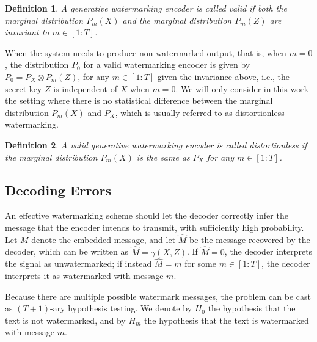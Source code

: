 \documentclass[11pt,letterpaper]{article}
\newtheorem{definition}{\textbf{Definition}}%
\begin{document}
\begin{definition}\label{req:encoder_requirement}
A generative watermarking encoder is called valid if both the marginal distribution $P_m(X)$ and the marginal distribution $P_m(Z)$ are invariant to $m\in[1:T]$. 
\end{definition}

When the system needs to produce non-watermarked output, that is, when $m = 0$, the distribution $P_0$ for a valid watermarking encoder is given by $P_0=P_X\otimes P_m(Z)$, for any $m\in[1:T]$ given the invariance above, i.e., the secret key $Z$ is independent of $X$ when $m=0$. We will only consider in this work the setting where there is no statistical difference between the marginal distribution $P_m(X)$ and $P_X$, which is usually referred to as distortionless watermarking.
\begin{definition}\label{req:distortionless}
A valid generative watermarking encoder is called distortionless if the marginal distribution $P_m(X)$ is the same as $P_X$ for any $m\in [1:T]$.
\end{definition} 


\subsection{Decoding Errors}

An effective watermarking scheme should let the decoder correctly infer the message that the encoder intends to transmit, with sufficiently high probability. Let $M$ denote the embedded message, and let $\hat{M}$ be the message recovered by the decoder, which can be written as $\hat{M} = \gamma(X, Z)$. If $\hat{M} = 0$, the decoder interprets the signal as unwatermarked; if instead $\hat{M} = m$ for some $m \in [1:T]$, the decoder interprets it as watermarked with message $m$. 

Because there are multiple possible watermark messages, the problem can be cast as $(T+1)$-ary hypothesis testing. We denote by $H_0$ the hypothesis that the text is not watermarked, and by $H_m$ the hypothesis that the text is watermarked with message $m$.
\end{document}
